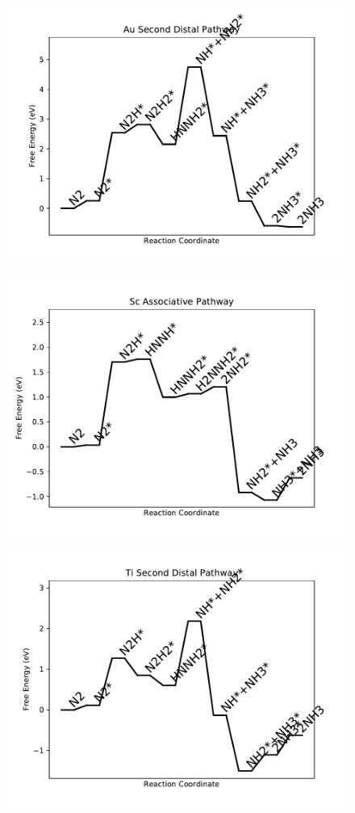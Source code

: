 \begin{figure}
\includegraphics[width=0.8\linewidth]{data/plots/Au_distal_2.pdf}
\label{fig:Au_distal_2}
\end{figure}

\begin{figure}
\includegraphics[width=0.8\linewidth]{data/plots/Sc_associative.pdf}
\label{fig:Sc_associative}
\end{figure}

\begin{figure}
\includegraphics[width=0.8\linewidth]{data/plots/Ti_distal_2.pdf}
\label{fig:Ti_distal_2}
\end{figure}

